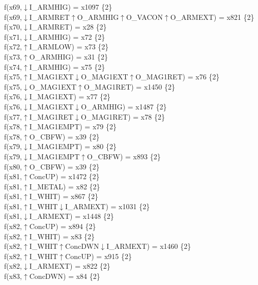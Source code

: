 f(x69,$\downarrow$I\_ARMHIG) = x1097 \{2\} \\  
f(x69,$\downarrow$I\_ARMRET$\uparrow$O\_ARMHIG$\uparrow$O\_VACON$\uparrow$O\_ARMEXT) = x821 \{2\} \\  
f(x70,$\downarrow$I\_ARMRET) = x28 \{2\} \\  
f(x71,$\downarrow$I\_ARMHIG) = x72 \{2\} \\  
f(x72,$\uparrow$I\_ARMLOW) = x73 \{2\} \\  
f(x73,$\uparrow$O\_ARMHIG) = x31 \{2\} \\  
f(x74,$\uparrow$I\_ARMHIG) = x75 \{2\} \\  
f(x75,$\uparrow$I\_MAG1EXT$\downarrow$O\_MAG1EXT$\uparrow$O\_MAG1RET) = x76 \{2\} \\  
f(x75,$\downarrow$O\_MAG1EXT$\uparrow$O\_MAG1RET) = x1450 \{2\} \\  
f(x76,$\downarrow$I\_MAG1EXT) = x77 \{2\} \\  
f(x76,$\downarrow$I\_MAG1EXT$\downarrow$O\_ARMHIG) = x1487 \{2\} \\  
f(x77,$\uparrow$I\_MAG1RET$\downarrow$O\_MAG1RET) = x78 \{2\} \\  
f(x78,$\uparrow$I\_MAG1EMPT) = x79 \{2\} \\  
f(x78,$\uparrow$O\_CBFW) = x39 \{2\} \\  
f(x79,$\downarrow$I\_MAG1EMPT) = x80 \{2\} \\  
f(x79,$\downarrow$I\_MAG1EMPT$\uparrow$O\_CBFW) = x893 \{2\} \\  
f(x80,$\uparrow$O\_CBFW) = x39 \{2\} \\  
f(x81,$\uparrow$ConcUP) = x1472 \{2\} \\  
f(x81,$\uparrow$I\_METAL) = x82 \{2\} \\  
f(x81,$\uparrow$I\_WHIT) = x867 \{2\} \\  
f(x81,$\uparrow$I\_WHIT$\downarrow$I\_ARMEXT) = x1031 \{2\} \\  
f(x81,$\downarrow$I\_ARMEXT) = x1448 \{2\} \\  
f(x82,$\uparrow$ConcUP) = x894 \{2\} \\  
f(x82,$\uparrow$I\_WHIT) = x83 \{2\} \\  
f(x82,$\uparrow$I\_WHIT$\uparrow$ConcDWN$\downarrow$I\_ARMEXT) = x1460 \{2\} \\  
f(x82,$\uparrow$I\_WHIT$\uparrow$ConcUP) = x915 \{2\} \\  
f(x82,$\downarrow$I\_ARMEXT) = x822 \{2\} \\  
f(x83,$\uparrow$ConcDWN) = x84 \{2\} \\  
